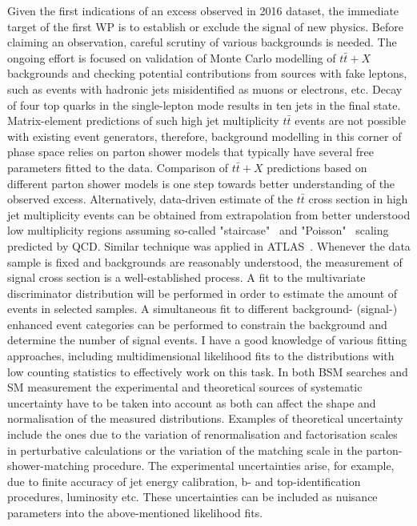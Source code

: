 \textcolor{\mynew}{
Given the first indications of an excess observed in 2016 dataset, the immediate target of the first WP is to establish or exclude the signal of new physics. Before claiming an observation, careful scrutiny of various backgrounds is needed. The ongoing effort is focused on validation of Monte Carlo modelling of $t\bar{t}+X$ backgrounds and checking potential contributions from sources with fake leptons, such as events with hadronic jets misidentified as muons or electrons, etc. 
}
\textcolor{\mynew}{
Decay of four top quarks in the single-lepton mode results in ten jets in the final state. Matrix-element predictions of such high jet multiplicity $t\bar{t}$ events are not possible with existing event generators, therefore, background modelling in this corner of phase space relies on parton shower models that typically have several free parameters fitted to the data. Comparison of $t\bar{t}+X$ predictions based on different parton shower models is one step towards better understanding of the observed excess. Alternatively, data-driven estimate of the $t\bar{t}$ cross section in high jet multiplicity events can be obtained from extrapolation from better understood low multiplicity regions assuming so-called "staircase"~\cite{Ellis:1985vn} and "Poisson"~\cite{Gerwick:2012hq} scaling predicted by QCD. Similar technique was applied in ATLAS~\cite{Aaboud:2017faq}.
}
\textcolor{\mynew}{
Whenever the data sample is fixed and backgrounds are reasonably understood, the measurement of signal cross section is a well-established process. A fit to the multivariate discriminator distribution will be performed in order to estimate the amount of \fourtop events in selected samples. A simultaneous fit to different background- (signal-) enhanced event categories can be performed to constrain the background and determine the number of signal events. I have a good knowledge of various fitting approaches, including multidimensional likelihood fits to the distributions with low counting statistics to effectively work on this task.
}
\textcolor{\mynew}{
In both BSM searches and SM measurement the experimental and theoretical sources of systematic uncertainty have to be taken into account as both can affect the shape and normalisation of the measured distributions. Examples of theoretical uncertainty include the ones due to the variation of renormalisation and factorisation scales in perturbative calculations or the variation of the matching scale in the parton-shower-matching procedure. The experimental uncertainties arise, for example, due to finite accuracy of jet energy calibration, b- and top-identification procedures, luminosity etc. These uncertainties can be included as nuisance parameters into the above-mentioned likelihood fits.
}
